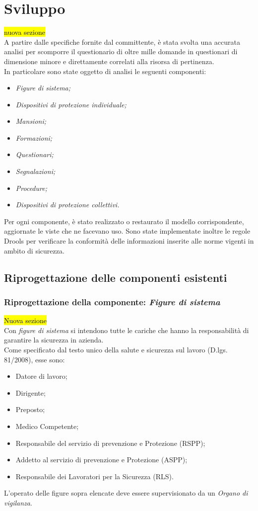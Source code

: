 \cleardoublepage
\section{Sviluppo}
\hl{nuova sezione} \\
A partire dalle specifiche fornite dal committente, è stata svolta una accurata analisi per scomporre il questionario di oltre mille domande in questionari di dimensione minore e direttamente correlati alla risorsa di pertinenza.\\
In particolare sono state oggetto di analisi le seguenti componenti:
\begin{itemize}
	\item \textit{Figure di sistema;}
	\item \textit{Dispositivi di protezione individuale;}
	\item \textit{Mansioni;}
	\item \textit{Formazioni;}
	\item \textit{Questionari;}
	\item \textit{Segnalazioni;}
	\item \textit{Procedure;}
	\item \textit{Dispositivi di protezione collettivi.}
\end{itemize}
Per ogni componente, è stato realizzato o restaurato il modello corrispondente, aggiornate le viste che ne facevano uso. Sono state implementate inoltre le regole Drools per verificare la conformità delle informazioni inserite alle norme vigenti in ambito di sicurezza.
\subsection{Riprogettazione delle componenti esistenti}
	
	
\subsubsection{Riprogettazione della componente: \textit{Figure di sistema}}
\hl{Nuova sezione}\\
	Con \textit{figure di sistema} si intendono tutte le cariche che hanno la responsabilità di garantire la sicurezza in azienda. \\
	Come specificato dal testo unico della salute e sicurezza sul lavoro (D.lgs. 81/2008), esse sono: 
	\begin{itemize}
		\item Datore di lavoro;
		\item Dirigente;
		\item Preposto;
		\item Medico Competente;
		\item Responsabile del servizio di prevenzione e Protezione (RSPP);
		\item Addetto al servizio di prevenzione e Protezione (ASPP);
		\item Responsabile dei Lavoratori per la Sicurezza (RLS).
	\end{itemize}
	L'operato delle figure sopra elencate deve essere supervisionato da un \textit{Organo di vigilanza}.


